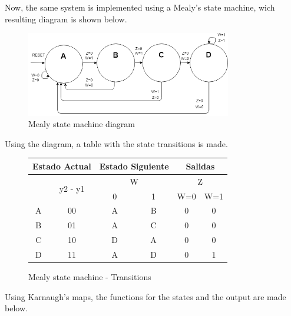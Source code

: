 Now, the same system is implemented using a Mealy's 
state machine, wich resulting diagram is shown below.

\begin{figure}[H]
    \begin{centering}
    \includegraphics[width=0.8\textwidth]{Graficos2/2b_fsm.png}
    \par\end{centering}
    \caption{Mealy state machine diagram}
\end{figure}

Using the diagram, a table with the state 
transitions is made.
\begin{figure}[H]
    \begin{center}
\begin{tabular}{|c|c|c|c||c|c|}
    \hline 
    \multicolumn{2}{|c|}{Estado Actual} & \multicolumn{2}{c||}{Estado Siguiente} & \multicolumn{2}{c|}{Salidas}\tabularnewline
    \hline 
    \hline 
    \multirow{2}{*}{} & \multirow{2}{*}{y2 - y1} & \multicolumn{2}{c||}{W} & \multicolumn{2}{c|}{Z}\tabularnewline
    \cline{3-6} 
     &  & \multicolumn{1}{c|}{0} & \multicolumn{1}{c||}{1} & W=0 & W=1\tabularnewline
    \hline 
    A & 00 & A & B & 0 & 0\tabularnewline
    \hline 
    B & 01 & A & C & 0 & 0\tabularnewline
    \hline 
    C & 10 & D & A & 0 & 0\tabularnewline
    \hline 
    D & 11 & A & D & 0 & 1\tabularnewline
    \hline 
    \end{tabular}
    \caption{Mealy state machine - Transitions}
\end{center}
\end{figure}

Using Karnaugh's maps, the functions for the 
states and the output are made below.

